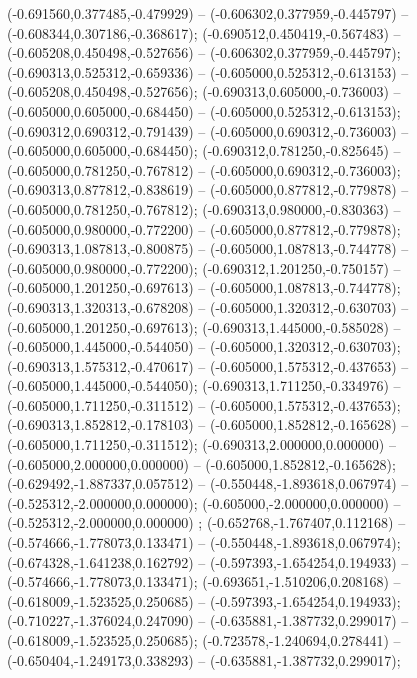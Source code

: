  (-0.691560,0.377485,-0.479929) -- (-0.606302,0.377959,-0.445797) -- (-0.608344,0.307186,-0.368617);
 (-0.690512,0.450419,-0.567483) -- (-0.605208,0.450498,-0.527656) -- (-0.606302,0.377959,-0.445797);
 (-0.690313,0.525312,-0.659336) -- (-0.605000,0.525312,-0.613153) -- (-0.605208,0.450498,-0.527656);
 (-0.690313,0.605000,-0.736003) -- (-0.605000,0.605000,-0.684450) -- (-0.605000,0.525312,-0.613153);
 (-0.690312,0.690312,-0.791439) -- (-0.605000,0.690312,-0.736003) -- (-0.605000,0.605000,-0.684450);
 (-0.690312,0.781250,-0.825645) -- (-0.605000,0.781250,-0.767812) -- (-0.605000,0.690312,-0.736003);
 (-0.690313,0.877812,-0.838619) -- (-0.605000,0.877812,-0.779878) -- (-0.605000,0.781250,-0.767812);
 (-0.690313,0.980000,-0.830363) -- (-0.605000,0.980000,-0.772200) -- (-0.605000,0.877812,-0.779878);
 (-0.690313,1.087813,-0.800875) -- (-0.605000,1.087813,-0.744778) -- (-0.605000,0.980000,-0.772200);
 (-0.690312,1.201250,-0.750157) -- (-0.605000,1.201250,-0.697613) -- (-0.605000,1.087813,-0.744778);
 (-0.690313,1.320313,-0.678208) -- (-0.605000,1.320312,-0.630703) -- (-0.605000,1.201250,-0.697613);
 (-0.690313,1.445000,-0.585028) -- (-0.605000,1.445000,-0.544050) -- (-0.605000,1.320312,-0.630703);
 (-0.690313,1.575312,-0.470617) -- (-0.605000,1.575312,-0.437653) -- (-0.605000,1.445000,-0.544050);
 (-0.690313,1.711250,-0.334976) -- (-0.605000,1.711250,-0.311512) -- (-0.605000,1.575312,-0.437653);
 (-0.690313,1.852812,-0.178103) -- (-0.605000,1.852812,-0.165628) -- (-0.605000,1.711250,-0.311512);
 (-0.690313,2.000000,0.000000) -- (-0.605000,2.000000,0.000000) -- (-0.605000,1.852812,-0.165628);
 (-0.629492,-1.887337,0.057512) -- (-0.550448,-1.893618,0.067974) -- (-0.525312,-2.000000,0.000000);
 (-0.605000,-2.000000,0.000000) -- (-0.525312,-2.000000,0.000000) ;
 (-0.652768,-1.767407,0.112168) -- (-0.574666,-1.778073,0.133471) -- (-0.550448,-1.893618,0.067974);
 (-0.674328,-1.641238,0.162792) -- (-0.597393,-1.654254,0.194933) -- (-0.574666,-1.778073,0.133471);
 (-0.693651,-1.510206,0.208168) -- (-0.618009,-1.523525,0.250685) -- (-0.597393,-1.654254,0.194933);
 (-0.710227,-1.376024,0.247090) -- (-0.635881,-1.387732,0.299017) -- (-0.618009,-1.523525,0.250685);
 (-0.723578,-1.240694,0.278441) -- (-0.650404,-1.249173,0.338293) -- (-0.635881,-1.387732,0.299017);
